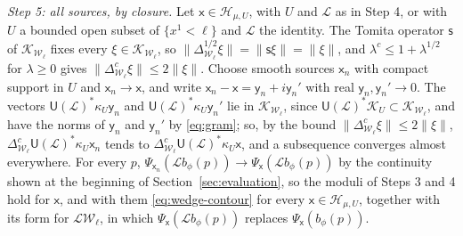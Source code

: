\documentclass[11pt]{amsart}
\numberwithin{equation}{section}
\theoremstyle{definition}
\newcommand{\Hh}{\mathcal H}
\newcommand{\sx}{\mathsf x}
\newcommand{\sy}{\mathsf y}
\begin{document}
\smallskip
\emph{Step 5: all sources, by closure.} Let \(\sx\in\Hh_{\mu,U}\), with
\(U\) and \(\mathcal L\) as in Step 4, or with \(U\) a bounded open subset
of \(\{x^1<\ell\}\) and \(\mathcal L\) the identity. The Tomita operator
\(\mathsf s\) of \(\mathcal K_{\mathcal W_\ell}\) fixes every
\(\xi\in\mathcal K_{\mathcal W_\ell}\), so
\(\lVert\Delta_{\mathcal W_\ell}^{1/2}\xi\rVert=\lVert\mathsf s\xi\rVert=\lVert\xi\rVert\),
and \(\lambda^c\le1+\lambda^{1/2}\) for \(\lambda\ge0\) gives
\(\lVert\Delta_{\mathcal W_\ell}^{c}\xi\rVert\le2\lVert\xi\rVert\). Choose smooth
sources \(\sx_n\) with compact support in \(U\) and \(\sx_n\to\sx\), and
write \(\sx_n-\sx=\sy_n+i\sy_n'\) with real \(\sy_n,\sy_n'\to0\). The vectors
\(\mathsf U(\mathcal L)^*\kappa_U\sy_n\) and
\(\mathsf U(\mathcal L)^*\kappa_U\sy_n'\) lie in \(\mathcal K_{\mathcal W_\ell}\),
since \(\mathsf U(\mathcal L)^*\mathcal K_U\subset\mathcal K_{\mathcal W_\ell}\),
and have the norms of \(\sy_n\) and \(\sy_n'\) by \eqref{eq:gram}; so, by the bound
\(\lVert\Delta_{\mathcal W_\ell}^{c}\xi\rVert\le2\lVert\xi\rVert\),
\(\Delta_{\mathcal W_\ell}^{c}\mathsf U(\mathcal L)^*\kappa_U\sx_n\) tends to
\(\Delta_{\mathcal W_\ell}^{c}\mathsf U(\mathcal L)^*\kappa_U\sx\), and a
subsequence converges almost everywhere. For every
\(p\), \(\Psi_{\sx_n}(\mathcal Lb_\phi(p))\to\Psi_\sx(\mathcal Lb_\phi(p))\) by
the continuity shown at the beginning of Section~\ref{sec:evaluation}, so
the moduli of Steps 3 and 4
hold for \(\sx\), and with them \eqref{eq:wedge-contour} for every
\(\sx\in\Hh_{\mu,U}\), together with its form for \(\mathcal L\mathcal W_\ell\),
in which \(\Psi_\sx(\mathcal Lb_\phi(p))\) replaces \(\Psi_\sx(b_\phi(p))\).
\end{document}
